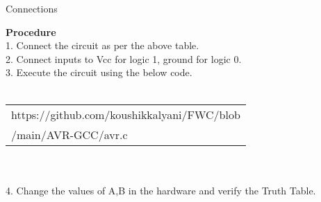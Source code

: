 \documentclass[journal,12pt,twocolumn]{IEEEtran}
\begin{document}
\begin{center}
    Connections
\end{center}
\textbf{Procedure}\\
1. Connect the circuit as per the above table.\\
2. Connect inputs to Vcc for logic 1, ground for logic 0.\\
3. Execute the circuit using the below code.\\
\\\begin{tabularx}{0.45\textwidth} { 
  | >{\centering\arraybackslash}X |
 }
  \hline
https://github.com/koushikkalyani/FWC/blob\\/main/AVR-GCC/avr.c\\
  \hline
\end{tabularx}\\
\\4. Change the values of A,B in the hardware and verify the Truth Table.\\
\end{document}
